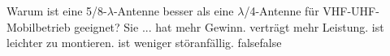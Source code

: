     {Warum ist eine 5/8-$\lambda$-Antenne besser als eine $\lambda$/4-Antenne für VHF-UHF-Mobilbetrieb geeignet? Sie ...}
    {hat mehr Gewinn.}
    {verträgt mehr Leistung.}
    {ist leichter zu montieren.}
    {ist weniger störanfällig.}
    {false}{false}